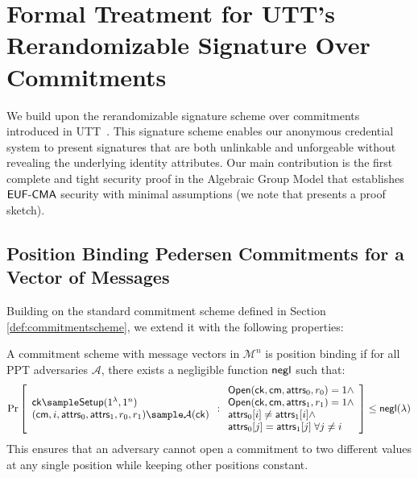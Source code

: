\section{Formal Treatment for UTT's Rerandomizable Signature Over Commitments}\label{sec:rerandsig_g1}
We build upon the rerandomizable signature scheme over commitments introduced in UTT~\cite{tomescu_utt_2022}. This signature scheme enables our anonymous credential system to present signatures that are both unlinkable and unforgeable without revealing the underlying identity attributes. Our main contribution is the first complete and tight security proof in the Algebraic Group Model that establishes $\mathsf{EUF\text{-}CMA}$ security with minimal assumptions (we note that \cite{tomescu_utt_2022} presents a proof sketch).




\subsection{Position Binding Pedersen Commitments for a Vector of Messages}

Building on the standard commitment scheme defined in Section \ref{def:commitmentscheme}, we extend it with the following properties:


\begin{definition}
A commitment scheme with message vectors in $\mathcal{M}^n$ is position binding if for all PPT adversaries $\mathcal{A}$, there exists a negligible function $\mathsf{negl}$ such that:
\[
    \Pr
    \left[
        \begin{array}{l}
        \mathsf{ck} \sample \mathsf{Setup}(1^\lambda, 1^n) \\
        (\mathsf{cm}, i, \attrs_0, \attrs_1, r_0, r_1) \sample \mathcal{A}(\mathsf{ck}) 
        \end{array}
        : \begin{array}{l}
            \mathsf{Open}(\mathsf{ck}, \mathsf{cm}, \attrs_0, r_0) = 1 \land \\
            \mathsf{Open}(\mathsf{ck}, \mathsf{cm}, \attrs_1, r_1) = 1 \land \\
            \attrs_0[i] \neq \attrs_1[i] \land \\
            \attrs_0[j] = \attrs_1[j] \; \forall j \neq i
          \end{array}
    \right] \leq \negl(\lambda)
\]
This ensures that an adversary cannot open a commitment to two different values at any single position while keeping other positions constant.
\end{definition}


